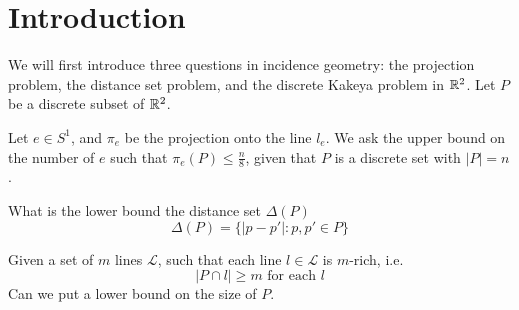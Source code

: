 \chapter{Introduction}
We will first introduce three questions in incidence geometry: the projection problem, the distance set problem, and the discrete Kakeya problem in $\mathbb{R}^2$. Let $P$ be a discrete subset of $\mathbb{R}^2$.

\begin{problem}[ (Projection)]
    Let $e\in S^1$, and $\pi_e$ be the projection onto the line $l_e$. We ask the upper bound on the number of $e$ such that $\pi_e(P)\leq\frac{n}{8}$, given that $P$ is a discrete set with $|P|=n$. 
\end{problem}
\begin{problem}
    What is the lower bound the distance set $\Delta(P)$
    \begin{equation*}
        \Delta(P)=\{|p-p'|: p,p'\in P\}
    \end{equation*}
\end{problem}
\begin{problem}
    Given a set of $m$ lines $\mathcal{L}$, such that each line $l\in\mathcal{L}$ is $m$-rich, i.e.
    \begin{equation*}
        |P\cap l|\geq m \text{ for each } l
    \end{equation*}
    Can we put a lower bound on the size of $P$.
\end{problem}

